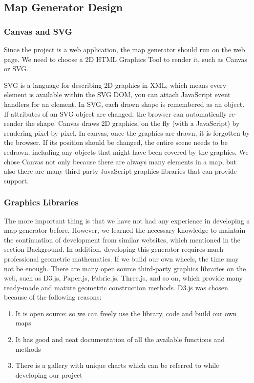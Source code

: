 \subsection{Map Generator Design}
\label{sec:Design>Map Generator Design}
\subsubsection{Canvas and SVG}
\label{sec:Design>Map Generator Design>Canvas and SVG}
Since the project is a web application, the map generator should run on the web page. We need to choose a 2D HTML Graphics Tool to render it, such as Canvas or SVG.

SVG is a language for describing 2D graphics in XML, which means every element is available within the SVG DOM, you can attach JavaScript event handlers for an element. In SVG, each drawn shape is remembered as an object. If attributes of an SVG object are changed, the browser can automatically re-render the shape. Canvas draws 2D graphics, on the fly (with a JavaScript) by rendering pixel by pixel. In canvas, once the graphics are drawn, it is forgotten by the browser. If its position should be changed, the entire scene needs to be redrawn, including any objects that might have been covered by the graphics. We chose Canvas not only because there are always many elements in a map, but also there are many third-party JavaScript graphics libraries that can provide support.

\subsubsection{Graphics Libraries}
\label{sec:Design>Map Generator Design>Graphics Libraries}
The more important thing is that we have not had any experience in developing a map generator before. However, we learned the necessary knowledge to maintain the continuation of development from similar websites, which mentioned in the section Background. In addition, developing this generator requires much professional geometric mathematics. If we build our own wheels, the time may not be enough. There are many open source third-party graphics libraries on the web, such as D3.js, Paper.js, Fabric.js, Three.js, and so on, which provide many ready-made and mature geometric construction methods. D3.js was chosen because of the following reasons:
\begin{enumerate}
  \item It is open source: so we can freely use the library, code and build our own maps
  \item It has good and neat documentation of all the available functions and methods
  \item There is a gallery with unique charts which can be referred to while developing our project
\end{enumerate}

